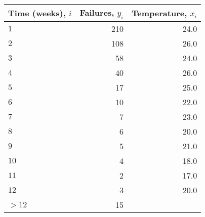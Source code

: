 \begin{tabular}{lrr}
\toprule
Time (weeks), $i$ &  Failures, $y_i$ &  Temperature, $x_i$ \\
\midrule
              $1$ &              210 &                24.0 \\
              $2$ &              108 &                26.0 \\
              $3$ &               58 &                24.0 \\
              $4$ &               40 &                26.0 \\
              $5$ &               17 &                25.0 \\
              $6$ &               10 &                22.0 \\
              $7$ &                7 &                23.0 \\
              $8$ &                6 &                20.0 \\
              $9$ &                5 &                21.0 \\
             $10$ &                4 &                18.0 \\
             $11$ &                2 &                17.0 \\
             $12$ &                3 &                20.0 \\
            $>12$ &               15 &                     \\
\bottomrule
\end{tabular}
